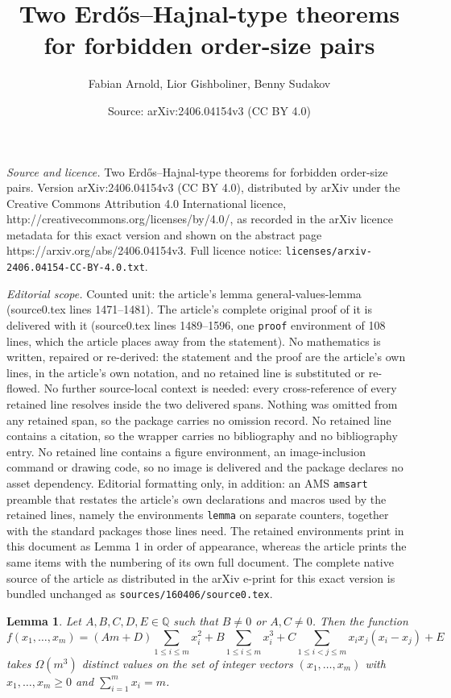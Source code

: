 \documentclass[10pt,a4paper]{amsart}
\title{\vspace{-0.9cm} Two Erd\H{o}s--Hajnal-type theorems for forbidden order-size pairs}
\author{Fabian Arnold, Lior Gishboliner, Benny Sudakov}
\date{Source: arXiv:2406.04154v3 (CC BY 4.0)}
\newtheorem{lemma}{Lemma}
\begin{document}
\maketitle

\noindent\emph{Source and licence.} \vspace{-0.9cm} Two Erd\H{o}s--Hajnal-type theorems for forbidden order-size pairs. Version arXiv:2406.04154v3 (CC BY 4.0), distributed by arXiv under the Creative Commons Attribution 4.0 International licence, http://creativecommons.org/licenses/by/4.0/, as recorded in the arXiv licence metadata for this exact version and shown on the abstract page https://arxiv.org/abs/2406.04154v3. Full licence notice: \texttt{licenses/arxiv-2406.04154-CC-BY-4.0.txt}.\par\smallskip

\noindent\textit{Editorial scope.} Counted unit: the article's lemma general-values-lemma (source0.tex lines 1471--1481). The article's complete original proof of it is delivered with it (source0.tex lines 1489--1596, one \texttt{proof} environment of 108 lines, which the article places away from the statement). No mathematics is written, repaired or re-derived: the statement and the proof are the article's own lines, in the article's own notation, and no retained line is substituted or re-flowed.  No further source-local context is needed: every cross-reference of every retained line resolves inside the two delivered spans.  Nothing was omitted from any retained span, so the package carries no omission record.  No retained line contains a citation, so the wrapper carries no bibliography and no bibliography entry.  No retained line contains a figure environment, an image-inclusion command or drawing code, so no image is delivered and the package declares no asset dependency.  Editorial formatting only, in addition: an AMS \texttt{amsart} preamble that restates the article's own declarations and macros used by the retained lines, namely the environments \texttt{lemma} on separate counters, together with the standard packages those lines need.  The retained environments print in this document as Lemma 1 in order of appearance, whereas the article prints the same items with the numbering of its own full document.  The complete native source of the article as distributed in the arXiv e-print for this exact version is bundled unchanged as \texttt{sources/160406/source0.tex}.
\begin{lemma} \label{general-values-lemma}
    Let $A,B,C,D,E \in \mathbb{Q}$ such that $B \neq 0$ or $A,C \neq 0$.
    Then the function 
	$$
	f(x_1,\dots,x_m) = (Am+D) \sum_{1 \leq i \leq m} x_i^2 + 
	B \sum_{1 \leq i \leq m} x_i^3 + C \sum_{1 \leq i < j \leq m} x_i x_j (x_i - x_j)+E
	$$
    takes $\Omega(m^3)$ distinct values on the set of integer vectors $(x_1,\dots,x_m)$ with $x_1,\dots,x_m \geq 0$ and 
    $\sum_{i=1}^m x_i = m$.
\end{lemma}
\end{document}
